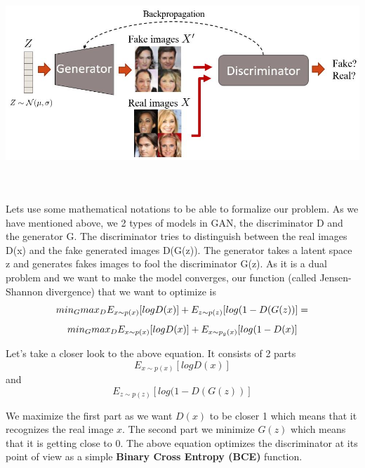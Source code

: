 \documentclass{winnower}
\begin{document}
\begin{center}
\includegraphics[width=15cm, height=8cm]{train.jpg}
\end{center}

Lets use some mathematical notations to be able to formalize our problem. As we have mentioned above, we 2 types of models in GAN, the discriminator D and the generator G. The discriminator tries to distinguish between the real images D(x) and the fake generated images D(G(z)). The generator takes a latent space z and generates fakes images to fool the discriminator G(z). As it is a dual problem and we want to make the model converges, our function (called Jensen-Shannon divergence) that we want to optimize is \[min_G \\ max_D \\ E_{x\sim p(x)} [log D(x)] + E_{z\sim p(z)} [log(1 - D(G(z))] = \] \[min_G \\ max_D \\ E_{x\sim p(x)} [log D(x)] + E_{x\sim p_g(x)} [log(1 - D(x)]\]\newline

Let's take a closer look to the above equation. It consists of 2 parts \[E_{x\sim p(x)} [log D(x)]\] and \[E_{z\sim p(z)} [log(1 - D(G(z))]\]\newline

We maximize the first part as we want \(D(x)\) to be closer 1 which means that it recognizes the real image \(x\). The second part we minimize \(G(z)\) which means that it is getting close to \(0\). The above equation optimizes the discriminator at its point of view as a simple \textbf{Binary Cross Entropy (BCE)} function.

\end{document}
